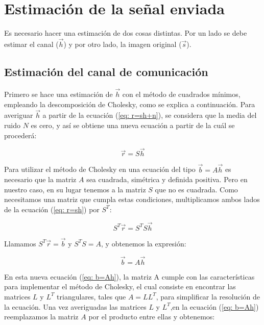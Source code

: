 \section{Estimaci\'on de la se\~nal enviada}

Es necesario hacer una estimaci\'on de dos cosas distintas. Por un lado se debe estimar el canal ($\vec{h}$) y por otro lado, la imagen original  ($\vec{s}$).

\subsection{Estimaci\'on del canal de comunicaci\'on}

Primero se hace una estimaci\'on de $\vec{h}$ con el m\'etodo de cuadrados m\'inimos, empleando la descomposici\'on de Cholesky, como se explica a continuaci\'on.  Para averiguar $\vec{h}$ a partir de la ecuaci\'on (\ref{eq: r=sh+n}), se considera que la media del ruido $N$ es cero, y as\'i se obtiene una nueva ecuaci\'on a partir de la cu\'al se proceder\'a:

\begin{equation} 
\vec{r} = S \vec{h}
\label{eq: r=sh} 
\end{equation} 

Para utilizar el m\'etodo de Cholesky en una ecuaci\'on del tipo $\vec{b} = A \vec{h}$ es necesario que la matriz $A$ sea cuadrada, sim\'etrica y definida positiva. Pero en nuestro caso,  en su lugar tenemos a la matriz $S$ que no es  cuadrada. Como necesitamos una matriz que cumpla estas condiciones, multiplicamos ambos lados de la ecuaci\'on (\ref{eq: r=sh}) por $S^T$:

\begin{equation} 
S^T \vec{r} = S^T S \vec{h} 
\end{equation} 

Llamamos  $S^T \vec{r} = \vec{b}$ y  $S^T S = A$, y obtenemos la expresi\'on:

\begin{equation} 
\vec{b} = A \vec{h} 
\label{eq: b=Ah} 
\end{equation} 

En esta nueva ecuaci\'on (\ref{eq: b=Ah}), la matriz A cumple con las caracter\'isticas para implementar el m\'etodo de Cholesky, el cual consiste en encontrar las matrices $L$ y $L^T$ triangulares, tales que $A = L L^T$, para simplificar la resoluci\'on de la ecuaci\'on. Una vez averiguadas las matrices  $L$ y $L^T$,en la ecuaci\'on (\ref{eq: b=Ah}) reemplazamos la matriz $A$ por el producto entre ellas y obtenemos:

